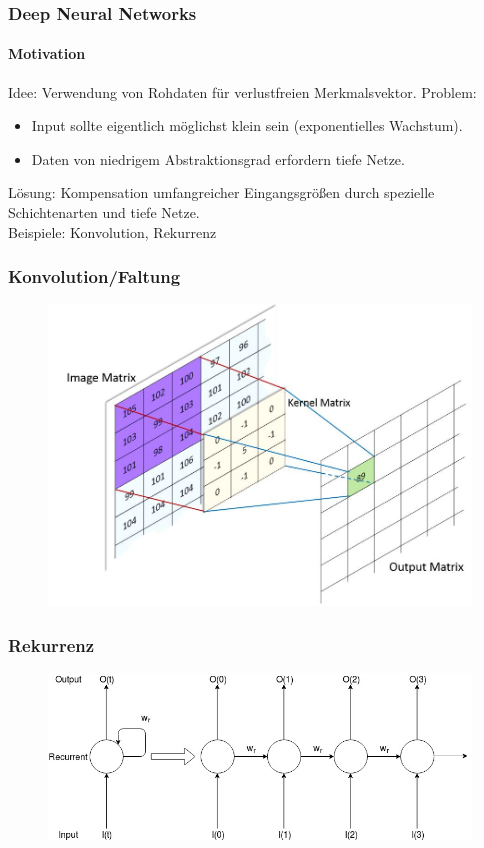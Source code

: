 \documentclass{beamer}
\begin{document}
\frame
{
	\frametitle{Deep Neural Networks}
	\framesubtitle{Motivation}
	Idee: Verwendung von Rohdaten für verlustfreien Merkmalsvektor.
	Problem: 
	\begin{itemize}
		\item Input sollte eigentlich möglichst klein sein (exponentielles Wachstum).
		\item Daten von niedrigem Abstraktionsgrad erfordern tiefe Netze.
	\end{itemize}
	Lösung: Kompensation umfangreicher Eingangsgrößen durch spezielle Schichtenarten und tiefe Netze.\\
	Beispiele: Konvolution, Rekurrenz
}

\frame
{
	\frametitle{Konvolution/Faltung}
	\begin{figure}[h!]
		\centering
		\includegraphics[width=0.7\linewidth,height=0.7\textheight, keepaspectratio]{res/old/conv.JPG}
		\footnotemark
	\end{figure}

}

\frame
{
	\frametitle{Rekurrenz}
	\begin{figure}[h!]
		\centering
		\includegraphics[width=\linewidth,height=\textheight, keepaspectratio]{res/old/recurrence.jpg}
	\end{figure}
}
\end{document}
